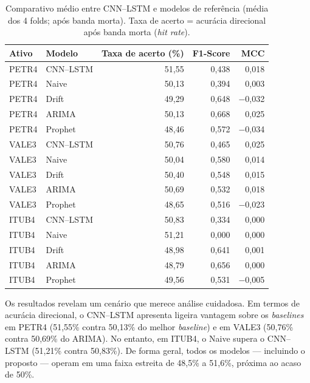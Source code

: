 \begin{table}[htbp]
  \centering
  \caption{Comparativo médio entre CNN--LSTM e modelos de referência (média dos 4 folds; após banda morta). Taxa de acerto = acurácia direcional após banda morta (\textit{hit rate}).}
  \label{tab:comparativo-geral}
  \begin{tabular}{l l r r r}
    \toprule
    \textbf{Ativo} & \textbf{Modelo} & \textbf{Taxa de acerto (\%)} & \textbf{F1-Score} & \textbf{MCC} \\
    \midrule
    PETR4 & CNN--LSTM & 51,55 & 0,438 & 0,018 \\
    PETR4 & Naive     & 50,13 & 0,394 & 0,003 \\
    PETR4 & Drift     & 49,29 & 0,648 & $-$0,032 \\
    PETR4 & ARIMA     & 50,13 & 0,668 & 0,025 \\
    PETR4 & Prophet   & 48,46 & 0,572 & $-$0,034 \\
    \midrule
    VALE3 & CNN--LSTM & 50,76 & 0,465 & 0,025 \\
    VALE3 & Naive     & 50,04 & 0,580 & 0,014 \\
    VALE3 & Drift     & 50,40 & 0,548 & 0,015 \\
    VALE3 & ARIMA     & 50,69 & 0,532 & 0,018 \\
    VALE3 & Prophet   & 48,65 & 0,516 & $-$0,023 \\
    \midrule
    ITUB4 & CNN--LSTM & 50,83 & 0,334 & 0,000 \\
    ITUB4 & Naive     & 51,21 & 0,000 & 0,000 \\
    ITUB4 & Drift     & 48,98 & 0,641 & 0,001 \\
    ITUB4 & ARIMA     & 48,79 & 0,656 & 0,000 \\
    ITUB4 & Prophet   & 49,56 & 0,531 & $-$0,005 \\
    \bottomrule
  \end{tabular}
\end{table}

Os resultados revelam um cenário que merece análise cuidadosa. Em termos de acurácia direcional,
o CNN--LSTM apresenta ligeira vantagem sobre os \textit{baselines} em PETR4 (51,55\% contra 50,13\% do melhor
\textit{baseline}) e em VALE3 (50,76\% contra 50,69\% do ARIMA). No entanto, em ITUB4, o Naive supera o
CNN--LSTM (51,21\% contra 50,83\%). De forma geral, todos os modelos --- incluindo o proposto ---
operam em uma faixa estreita de 48,5\% a 51,6\%, próxima ao acaso de 50\%.

